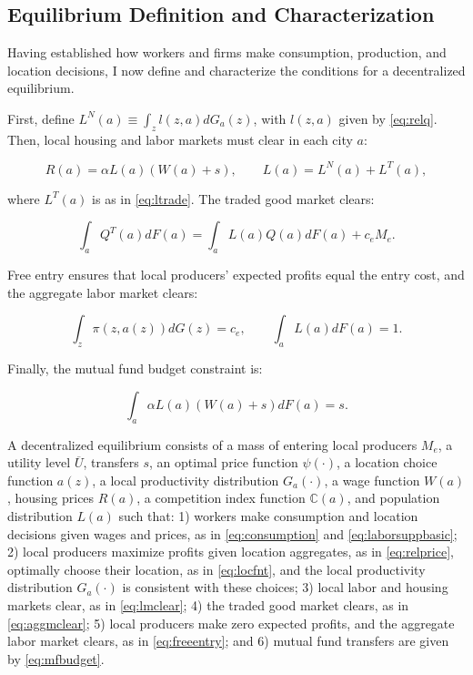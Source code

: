 \subsection{Equilibrium Definition and Characterization}

Having established how workers and firms make consumption, production, and location decisions, I now define and characterize the conditions for a decentralized equilibrium.

First, define $L^N(a) \equiv \int_z l(z,a) dG_a(z)$, with $l(z,a)$ given by \eqref{eq:relq}. Then, local housing and labor markets must clear in each city $a$:  

\begin{equation}\label{eq:lmclear}
	R(a) = \alpha L(a)(W(a)+s), \qquad L(a) = L^N(a) + L^T(a),
\end{equation}

where $L^T(a)$ is as in \eqref{eq:ltrade}. The traded good market clears:

\begin{equation}\label{eq:aggmclear}
	\int_a Q^T(a)dF(a) = \int_a L(a) Q(a) dF(a) + c_e M_e.
\end{equation}

Free entry ensures that local producers' expected profits equal the entry cost, and the aggregate labor market clears:

\begin{equation}\label{eq:freeentry}
	\int_z \pi(z, a(z)) dG(z) = c_e, \qquad \int_a L(a) dF(a) = 1.
\end{equation}

Finally, the mutual fund budget constraint is:

\begin{equation}\label{eq:mfbudget}
    \int_a \alpha L(a) (W(a) + s) dF(a) = s.
\end{equation}

A decentralized equilibrium consists of a mass of entering local producers $M_e$, a utility level $\overline{U}$, transfers $s$, an optimal price function $\psi(\cdot)$, a location choice function $a(z)$, a local productivity distribution $G_{a}(\cdot)$, a wage function $W(a)$, housing prices $R(a)$, a competition index function $\mathbb{C}(a)$, and population distribution $L(a)$ such that: 1) workers make consumption and location decisions given wages and prices, as in \eqref{eq:consumption} and \eqref{eq:laborsuppbasic}; 2) local producers maximize profits given location aggregates, as in \eqref{eq:relprice}, optimally choose their location, as in \eqref{eq:locfnt}, and the local productivity distribution $G_{a}(\cdot)$ is consistent with these choices; 3) local labor and housing markets clear, as in \eqref{eq:lmclear}; 4) the traded good market clears, as in \eqref{eq:aggmclear}; 5) local producers make zero expected profits, and the aggregate labor market clears, as in \eqref{eq:freeentry}; and 6) mutual fund transfers are given by \eqref{eq:mfbudget}.

